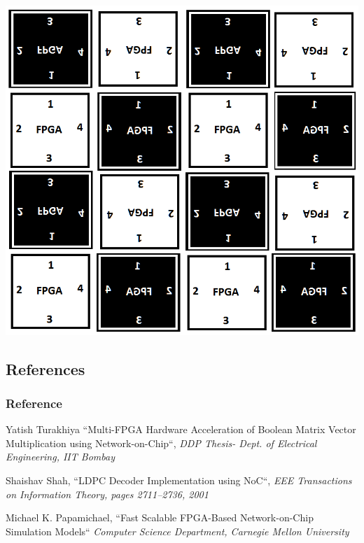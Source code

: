 \begin{frame}
\begin {center}
\includegraphics[scale=0.3]{./figs/MultiFPGANoC}
\end {center}
\end{frame}

\subsection{References}

\begin{frame}
\frametitle{Reference}
\begin{thebibliography}{10} 
\small
{} Yatish Turakhiya
``Multi-FPGA Hardware Acceleration of Boolean Matrix Vector Multiplication using Network-on-Chip``,
\emph{DDP Thesis- Dept. of Electrical Engineering, IIT Bombay}

 Shaishav Shah, 
``LDPC Decoder Implementation using NoC``,
\emph{EEE Transactions on Information Theory, pages 2711–2736, 2001}

 Michael K. Papamichael, 
``Fast Scalable FPGA-Based Network-on-Chip Simulation Models``
\emph{Computer Science Department, Carnegie Mellon University}


\end{thebibliography}
\end{frame}

